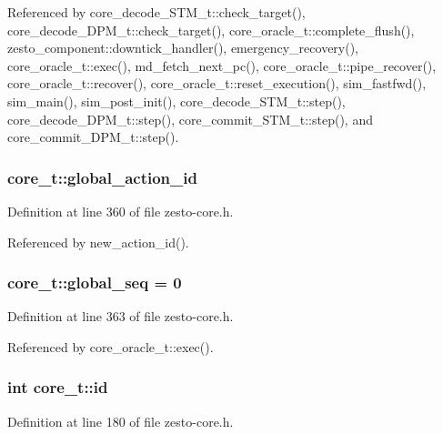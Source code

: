 Referenced by core\_\-decode\_\-STM\_\-t::check\_\-target(), core\_\-decode\_\-DPM\_\-t::check\_\-target(), core\_\-oracle\_\-t::complete\_\-flush(), zesto\_\-component::downtick\_\-handler(), emergency\_\-recovery(), core\_\-oracle\_\-t::exec(), md\_\-fetch\_\-next\_\-pc(), core\_\-oracle\_\-t::pipe\_\-recover(), core\_\-oracle\_\-t::recover(), core\_\-oracle\_\-t::reset\_\-execution(), sim\_\-fastfwd(), sim\_\-main(), sim\_\-post\_\-init(), core\_\-decode\_\-STM\_\-t::step(), core\_\-decode\_\-DPM\_\-t::step(), core\_\-commit\_\-STM\_\-t::step(), and core\_\-commit\_\-DPM\_\-t::step().
\subsubsection[{global\_\-action\_\-id}]{ {\bf core\_\-t::global\_\-action\_\-id}\hspace{0.3cm}{\tt  [protected]}}\label{classcore__t_1831df5e3a0845e40a38f47b044b4d05}




Definition at line 360 of file zesto-core.h.

Referenced by new\_\-action\_\-id().
\subsubsection[{global\_\-seq}]{ {\bf core\_\-t::global\_\-seq} = 0\hspace{0.3cm}{\tt  [static, protected]}}\label{classcore__t_d4bb322114e12a61f9c86ab9e30cb78a}




Definition at line 363 of file zesto-core.h.

Referenced by core\_\-oracle\_\-t::exec().
\subsubsection[{id}]{\setlength{\rightskip}{0pt plus 5cm}int {\bf core\_\-t::id}}\label{classcore__t_3a8653bac0ed9aefff8d1679ca81546f}




Definition at line 180 of file zesto-core.h.

